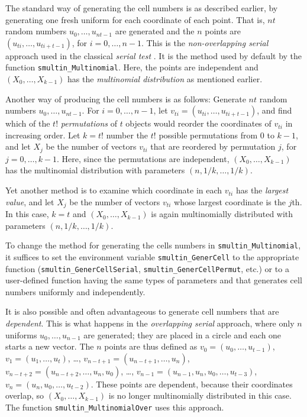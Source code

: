 The
 standard way of generating the cell numbers is as described earlier,
by generating one fresh uniform for each coordinate of each point.
That is, $nt$ random numbers $u_0,\dots,u_{nt-1}$ are generated and
the $n$ points are $(u_{ti},\dots,u_{ti+t-1})$, for $i=0,\dots,n-1$.
This is the {\em non-overlapping serial\/} approach used in the
classical {\em serial test\/} \cite{rKNU98a}.
It is the method used by default by the function
{\tt smultin\_Multinomial}.
Here, the points are independent and $(X_0,\dots,X_{k-1})$ has the
{\em multinomial distribution\/} as mentioned earlier.

Another way of producing the cell numbers is as follows:
Generate $nt$ random numbers $u_0,\dots,u_{nt-1}$.
For $i=0,\dots,n-1$, let $v_{ti} = (u_{ti},\dots,u_{ti+t-1})$,
and find which of the $t!$ {\em permutations\/} of $t$ objects would
reorder the coordinates of $v_{ti}$ in increasing order.
Let $k = t!$ number the $t!$ possible permutations from 0 to $k-1$,
and let $X_j$ be the number of vectors $v_{ti}$ that are reordered
by permutation $j$, for $j = 0,\dots,k-1$.
Here, since the permutations are independent, $(X_0,\dots,X_{k-1})$
has the multinomial distribution with parameters $(n,1/k,\dots,1/k)$.

Yet another method is to examine which coordinate in each $v_{ti}$ has
the {\em largest value\/}, and let $X_j$ be the number of vectors $v_{ti}$
whose largest coordinate is the $j$th.
In this case, $k=t$ and  $(X_0,\dots,X_{k-1})$ is again
multinomially distributed with parameters $(n,1/k,\dots,1/k)$.

To change the method for generating the cells numbers
in {\tt smultin\_Multinomial},
it suffices to set the environment variable {\tt smultin\_GenerCell}
to the appropriate function ({\tt smultin\_GenerCellSerial},
{\tt smultin\_GenerCellPermut}, etc.) or to
a user-defined function having the same types of parameters and
that generates cell numbers uniformly and independently.

It is also possible and often advantageous to generate cell numbers
that are {\em dependent}.  This is what happens in the
{\em overlapping serial\/} approach, where only $n$ uniforms
$u_0,\dots,u_{n-1}$ are generated; they are placed in a circle
and each one starts a new vector.  The $n$ points are thus
defined as $v_0 = (u_0,\dots,u_{t-1})$, $v_1=(u_1,\dots,u_t)$, \dots,
 $v_{n-t+1} = (u_{n-t+1},\dots,u_n)$,
 $v_{n-t+2} = (u_{n-t+2},\dots,u_n,u_0)$, \dots,
 $v_{n-1} = (u_{n-1},u_n,u_0,\dots,u_{t-3})$,
 $v_n = (u_n,u_0,\dots,u_{t-2})$.
These points are dependent, because their coordinates overlap,
so $(X_0,\dots,X_{k-1})$ is no longer multinomially distributed in
this case. The function {\tt smultin\_MultinomialOver} uses this approach.


